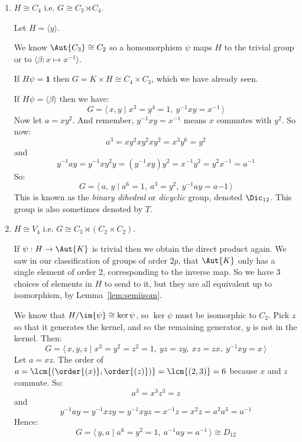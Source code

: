 \begin{enumerate}
    \item \(H \cong C_4\) i.e. \(G \cong C_3 \rtimes C_4\).

        Let \(H = \langle y \rangle\).

        We know \(\Aut{C_3} \cong C_2\) so a homomorphism \(\psi\) maps \(H\) to the trivial group or to \(\langle
        \beta:x \mapsto x^{-1} \rangle\).

        If \(H\psi = \bm{1}\) then \(G = K \times H \cong C_4 \times C_3\), which we have already seen.

        If \(H\psi = \langle \beta \rangle\) then we have:
        \[G = \langle\, x, y \mid x^3 = y^4 = 1,\ y^{-1}xy = x^{-1}\,\rangle\]
        Now let \(a = xy^2\).
        And remember, \(y^{-1}xy = x^{-1}\) means \(x\) commutes with \(y^2\).
        So now:
        \[a^3 = xy^2xy^2xy^2 = x^3y^6 = y^2\]
        and
        \[y^{-1}ay = y^{-1}xy^2y = (y^{-1}xy)y^2 = x^{-1}y^2 = y^2x^{-1} = a^{-1}\]
        So:
        \[G = \langle\, a,\,y \mid a^6 = 1,\ a^3 = y^2,\ y^{-1}ay = a{-1}\,\rangle\]
        This is known as the \emph{binary dihedral} or \emph{dicyclic} group, denoted \(\Dic_{12}\).
        This group is also sometimes denoted by \(T\).

    \item \(H \cong V_4\) i.e. \(G \cong C_3 \rtimes (C_2 \times C_2)\).

        If \(\psi:H \to \Aut{K}\) is trivial then we obtain the direct product again.
        We saw in our classification of groups of order \(2p\), that \(\Aut{K}\) only has a single element of order 2,
        corresponding to the inverse map.
        So we have 3 choices of elements in \(H\) to send to it, but they are all equivalent up to isomorphism, by
        Lemma~\ref{lem:semiisom}.

        We know that \(H / \im{\psi} \cong \ker{\psi}\), so \(\ker{\psi}\) must be isomorphic to \(C_2\).
        Pick \(z\) so that it generates the kernel, and so the remaining generator, \(y\) is not in the kernel.
        Then:
        \[G = \langle\, x, y, z \mid x^3 = y^2 = z^2 = 1,\ yz = zy,\ xz = zx,\ y^{-1}xy = x\,\rangle\]
        Let \(a = xz\).
        The order of \(a = \lcm{(\order{(x)}, \order{(z)})} = \lcm{(2, 3)} = 6\) because \(x\) and \(z\) commute.
        So:
        \[a^3 = x^3z^3 = z\]
        and
        \[ y^{-1}ay = y^{-1}xzy = y^{-1}xyz = x^{-1}z = x^2z = a^2a^3 = a^{-1}\]
        Hence:
        \[G = \langle\, y, a \mid a^6 = y^2 = 1,\ a^{-1}ay = a^{-1}\,\rangle
        \cong D_{12}\]
\end{enumerate}

